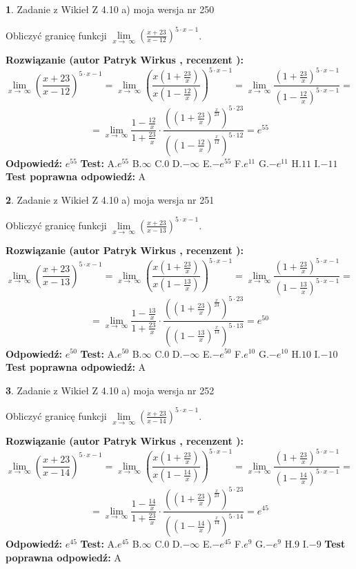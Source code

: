\documentclass[12pt, a4paper]{article}
\theoremstyle{definition} %
\newtheorem{zad}{}
\newcommand{\zadStart}[1]{\begin{zad}#1\newline}
\newcommand{\zadStop}{\end{zad}}
\newcommand{\rozwStart}[2]{\noindent \textbf{Rozwiązanie (autor #1 , recenzent #2): }\newline}
\newcommand{\rozwStop}{\newline}
\newcommand{\odpStart}{\noindent \textbf{Odpowiedź:}\newline}
\newcommand{\odpStop}{\newline}
\newcommand{\testStart}{\noindent \textbf{Test:}\newline}
\newcommand{\testStop}{\newline}
\newcommand{\kluczStart}{\noindent \textbf{Test poprawna odpowiedź:}\newline}
\newcommand{\kluczStop}{\newline}
\begin{document}
\zadStart{Zadanie z Wikieł Z 4.10 a) moja wersja nr 250}

Obliczyć granicę funkcji  $\lim\limits_{x\to\ \infty}(\frac{x+23}{x-12})^{5\cdot x-1}$.
\zadStop
\rozwStart{Patryk Wirkus}{}
$$\lim\limits_{x\to\ \infty}(\frac{x+23}{x-12})^{5\cdot x-1} = \lim\limits_{x\to\ \infty}(\frac{x(1+\frac{23}{x})}{x(1-\frac{12}{x})})^{5\cdot x-1}=\lim\limits_{x\to\ \infty}\frac{(1+\frac{23}{x})^{5\cdot x-1}}{(1-\frac{12}{x})^{5\cdot x-1}}=$$
$$=\lim\limits_{x\to\ \infty}\frac{1-\frac{12}{x}}{1+\frac{23}{x}}\cdot\frac{((1+\frac{23}{x})^{\frac{x}{23}})^{5\cdot23}}{((1-\frac{12}{x})^{\frac{x}{12}})^{5\cdot12}}=e^{55}$$
\rozwStop
\odpStart
$e^{55}$
\odpStop
\testStart
A.$e^{55}$ B.$\infty$ C.$0$ D.$-\infty$ E.$-e^{55}$
F.$e^{11}$ G.$-e^{11}$
H.$11$
I.$-11$
\testStop
\kluczStart
A
\kluczStop



\zadStart{Zadanie z Wikieł Z 4.10 a) moja wersja nr 251}

Obliczyć granicę funkcji  $\lim\limits_{x\to\ \infty}(\frac{x+23}{x-13})^{5\cdot x-1}$.
\zadStop
\rozwStart{Patryk Wirkus}{}
$$\lim\limits_{x\to\ \infty}(\frac{x+23}{x-13})^{5\cdot x-1} = \lim\limits_{x\to\ \infty}(\frac{x(1+\frac{23}{x})}{x(1-\frac{13}{x})})^{5\cdot x-1}=\lim\limits_{x\to\ \infty}\frac{(1+\frac{23}{x})^{5\cdot x-1}}{(1-\frac{13}{x})^{5\cdot x-1}}=$$
$$=\lim\limits_{x\to\ \infty}\frac{1-\frac{13}{x}}{1+\frac{23}{x}}\cdot\frac{((1+\frac{23}{x})^{\frac{x}{23}})^{5\cdot23}}{((1-\frac{13}{x})^{\frac{x}{13}})^{5\cdot13}}=e^{50}$$
\rozwStop
\odpStart
$e^{50}$
\odpStop
\testStart
A.$e^{50}$ B.$\infty$ C.$0$ D.$-\infty$ E.$-e^{50}$
F.$e^{10}$ G.$-e^{10}$
H.$10$
I.$-10$
\testStop
\kluczStart
A
\kluczStop



\zadStart{Zadanie z Wikieł Z 4.10 a) moja wersja nr 252}

Obliczyć granicę funkcji  $\lim\limits_{x\to\ \infty}(\frac{x+23}{x-14})^{5\cdot x-1}$.
\zadStop
\rozwStart{Patryk Wirkus}{}
$$\lim\limits_{x\to\ \infty}(\frac{x+23}{x-14})^{5\cdot x-1} = \lim\limits_{x\to\ \infty}(\frac{x(1+\frac{23}{x})}{x(1-\frac{14}{x})})^{5\cdot x-1}=\lim\limits_{x\to\ \infty}\frac{(1+\frac{23}{x})^{5\cdot x-1}}{(1-\frac{14}{x})^{5\cdot x-1}}=$$
$$=\lim\limits_{x\to\ \infty}\frac{1-\frac{14}{x}}{1+\frac{23}{x}}\cdot\frac{((1+\frac{23}{x})^{\frac{x}{23}})^{5\cdot23}}{((1-\frac{14}{x})^{\frac{x}{14}})^{5\cdot14}}=e^{45}$$
\rozwStop
\odpStart
$e^{45}$
\odpStop
\testStart
A.$e^{45}$ B.$\infty$ C.$0$ D.$-\infty$ E.$-e^{45}$
F.$e^{9}$ G.$-e^{9}$
H.$9$
I.$-9$
\testStop
\kluczStart
A
\kluczStop
\end{document}
